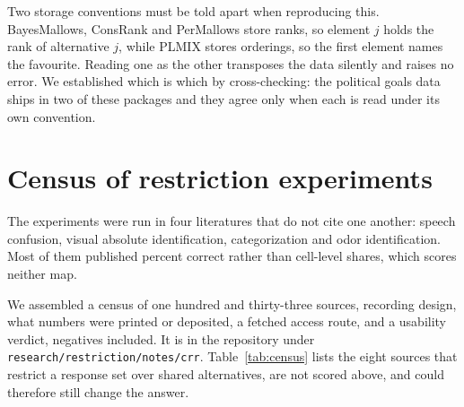 \documentclass[11pt]{article}
\theoremstyle{italichead}
\begin{document}
Two storage conventions must be told apart when reproducing this. BayesMallows,
ConsRank and PerMallows store ranks, so element $j$ holds the rank of alternative $j$,
while PLMIX stores orderings, so the first element names the favourite. Reading one as
the other transposes the data silently and raises no error. We established which is
which by cross-checking: the political goals data ships in two of these packages and
they agree only when each is read under its own convention.

\appendix
\section{Census of restriction experiments}
\label{sec:census}

The experiments were run in four literatures that do not cite one another: speech confusion,
visual absolute identification, categorization and odor identification. Most of them published
percent correct rather than cell-level shares, which scores neither map.

We assembled a census of one hundred and thirty-three sources, recording design, what numbers were printed
or deposited, a fetched access route, and a usability verdict, negatives included. It is in the repository under
\texttt{research/restriction/notes/crr}. Table~\ref{tab:census} lists the eight sources that restrict a
response set over shared alternatives, are not scored above, and could therefore still change
the answer.
\end{document}
